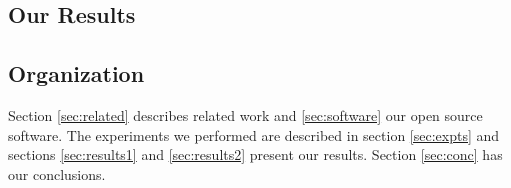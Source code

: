 \subsection{Our Results}

\subsection{Organization} Section \ref{sec:related} describes related work and \ref{sec:software} our open source software. The experiments we performed are described in section \ref{sec:expts} and sections \ref{sec:results1} and \ref{sec:results2} present our results. Section \ref{sec:conc} has our conclusions. 

